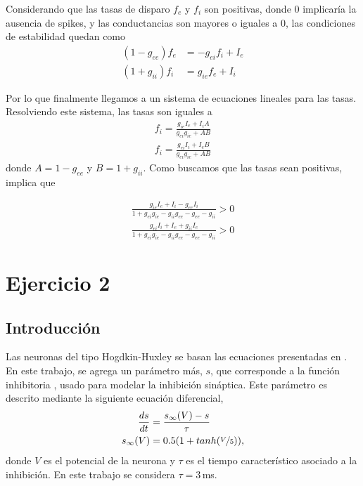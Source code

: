 Considerando que las tasas de disparo $f_e$ y $f_i$ son positivas, donde $0$ implicaría la ausencia de spikes, y las conductancias  son mayores o iguales a 0,  las condiciones de estabilidad quedan como
\begin{align}
     (1 -g_{ee}) f_e &= -g_{ei}f_i + I_e \label{fe}\\
    (1 + g_{ii}) f_i &=  g_{ie} f_e  + I_i
\end{align}

Por lo que finalmente llegamos a un sistema de ecuaciones lineales para las tasas. Resolviendo este sistema, las tasas son iguales a 
\begin{align}
     f_i = \frac{g_{ie}I_e + I_iA}{g_{ei}g_{ie}+ AB}\\
     f_i = \frac{g_{ei}I_i + I_eB}{g_{ei}g_{ie}+ AB} 
\end{align}
donde $A= 1 - g_{ee}$ y $B=1+g_{ii}$. Como buscamos que las tasas sean positivas, implica que 

\begin{align}
     \frac{g_{ie}I_e + I_i -g_{ee}I_i }{1+g_{ei}g_{ie} - g_{ii}g_{ee} -g_{ee}-g_{ii}} > 0\\
     \frac{g_{ei}I_i + I_e +g_{ii}I_e }{1+g_{ei}g_{ie} - g_{ii}g_{ee} -g_{ee}-g_{ii}} > 0 
\end{align}


\section*{Ejercicio 2}

\subsection{Introducción}

Las neuronas del tipo Hogdkin-Huxley se basan las ecuaciones presentadas en \cite{HH}. En este trabajo, se agrega un parámetro más, $s$, que corresponde a la función inhibitoria \cite{syn}, usado para modelar la inhibición sináptica. Este parámetro es descrito mediante la siguiente ecuación diferencial,
\begin{align}
    \frac{ds}{dt}&= \frac{s_\infty(V) - s}{\tau}\\
    s_\infty(V)&= 0.5(1+tanh(\nicefrac{V}{5})),
\end{align}
donde $V$ es el potencial de  la neurona y $\tau$ es el tiempo característico asociado a la inhibición. En este trabajo se considera  $\tau = 3\,$ms.

